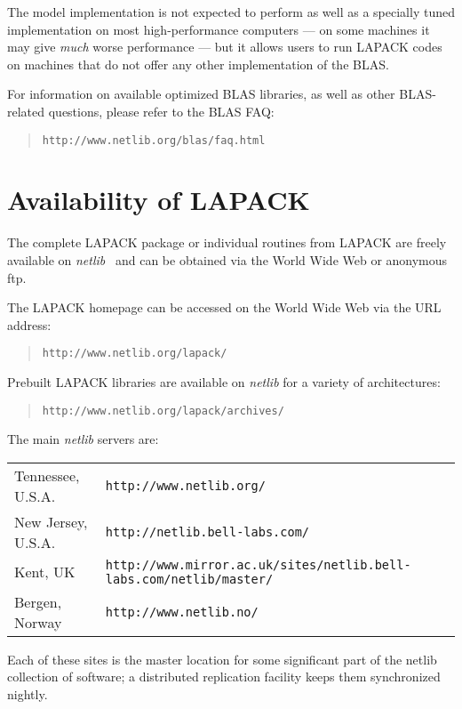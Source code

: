 The model implementation is not expected to perform as well as a specially tuned implementation
on most high-performance computers --- on some machines it may give {\it much}
worse performance ---  but it allows users to run LAPACK codes on machines that do not offer
any other implementation of the BLAS.

For information on available optimized BLAS libraries, as well as
other BLAS-related questions, please refer to the BLAS FAQ:
\begin{quote}
{\tt http://www.netlib.org/blas/faq.html}
\end{quote}

\section{Availability of LAPACK}

The complete LAPACK package or individual routines from LAPACK are
freely available on {\em netlib}~\cite{Dongarra87e} and can be obtained
via the World Wide Web or anonymous ftp.

The LAPACK homepage can be accessed on the World Wide Web via the URL address:
\begin{quote}
{\tt http://www.netlib.org/lapack/}
\end{quote}

Prebuilt LAPACK libraries are available on {\em netlib} for a variety of architectures:
\begin{quote}
{\tt http://www.netlib.org/lapack/archives/}
\end{quote}

The main {\em netlib} servers are:
\begin{center}
\begin{tabular}{l l}
Tennessee, U.S.A.  & {\tt http://www.netlib.org/} \\
New Jersey, U.S.A. & {\tt http://netlib.bell-labs.com/} \\
Kent, UK  & {\tt http://www.mirror.ac.uk/sites/netlib.bell-labs.com/netlib/master/} \\
Bergen, Norway     & {\tt http://www.netlib.no/}
\end{tabular}
\end{center}
Each of these sites is the master location for some significant part
of the netlib collection of software; a distributed replication facility
keeps them synchronized nightly.

